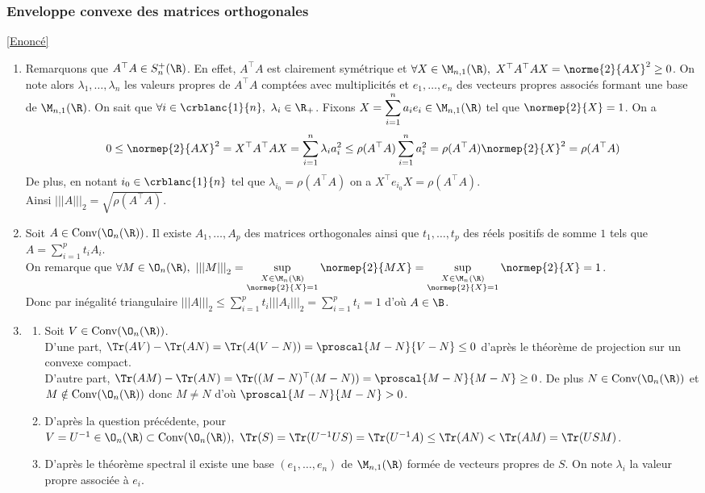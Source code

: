 \documentclass[8pt]{book}
\begin{document}
	\subsubsection{Enveloppe convexe des matrices orthogonales}
	\label{Enveloppe convexe des matrices orthogonalesd corrigé}
	\textcolor{blue}{\hyperref[Enveloppe convexe des matrices orthogonales]{[Enoncé]}}\\
	\begin{enumerate}[leftmargin=*]
		\item Remarquons que $A^\top A\in S_n^+(\R)$. En effet, $A^\top A$ est clairement symétrique et $\forall X\in \M_{n,1}(\R),\ X^\top A^\top AX=\norme{2}{AX}^2\geq 0$. On note alors $\lambda_1,\dots,\lambda_n$ les valeurs propres de $A^\top A$ comptées avec multiplicités et $e_1,\dots,e_n$ des vecteurs propres associés formant une base de $\M_{n,1}(\R)$. On sait que $\forall i\in \crblanc{1}{n},\ \lambda_i\in \R_+$. Fixons $X=\displaystyle\sum_{i=1}^na_ie_i\in \M_{n,1}(\R)$ tel que $\normep{2}{X}=1$. On a\\
		$$0\leq \normep{2}{AX}^2=X^\top A^\top AX=\sum_{i=1}^n\lambda_ia_i^2\leq \rho(A^\top A)\sum_{i=1}^na_i^2=\rho(A^\top A)\normep{2}{X}^2=\rho(A^\top A)$$
		De plus, en notant $i_0\in \crblanc{1}{n}$ tel que $\lambda_{i_0}=\rho(A^\top A)$ on a $X^\top e_{i_0}X=\rho(A^\top A)$.\\
		Ainsi ${|||A|||}_2=\sqrt{\rho(A^\top A)}$.
		\item Soit $A\in \text{Conv}(\O_n(\R))$. Il existe $A_1,\dots,A_p$ des matrices orthogonales ainsi que $t_1,\dots,t_p$ des réels positifs de somme $1$ tels que $A=\displaystyle\sum_{i=1}^pt_iA_i$.\\
		On remarque que $\forall M\in \O_n(\R),\ {|||M|||}_2=\sup\limits_{\substack{X\in \M_n(\R)\\\normep{2}{X}=1}}\normep{2}{MX}=\sup\limits_{\substack{X\in \M_n(\R)\\\normep{2}{X}=1}}\normep{2}{X}=1$.\\
		Donc par inégalité triangulaire ${|||A|||}_2\leq \displaystyle\sum_{i=1}^pt_i{|||A_i|||}_2=\sum_{i=1}^pt_i=1$ d'où $A\in \B$.
		\item \begin{enumerate}[label=\alph*.]
			\item Soit $V\in \text{Conv}(\O_n(\R))$.\\
			D'une part, $\Tr(AV)-\Tr(AN)=\Tr(A(V-N))=\proscal{M-N}{V-N}\leq 0$ d'après le théorème de projection sur un convexe compact.\\
			D'autre part, $\Tr(AM)-\Tr(AN)=\Tr((M-N)^\top(M-N))=\proscal{M-N}{M-N}\geq 0$. De plus $N\in \text{Conv}(\O_n(\R))$ et $M\notin \text{Conv}(\O_n(\R))$ donc $M\ne N$ d'où $\proscal{M-N}{M-N}>0$.
			\item D'après la question précédente, pour $V=U^{-1}\in \O_n(\R)\subset \text{Conv}(\O_n(\R)),\ \Tr(S)=\Tr(U^{-1}US)=\Tr(U^{-1}A)\leq \Tr(AN)<\Tr(AM)=\Tr(USM)$.
			\item D'après le théorème spectral il existe une base $(e_1,\dots,e_n)$ de $\M_{n,1}(\R)$ formée de vecteurs propres de $S$. On note $\lambda_i$ la valeur propre associée à $e_i$.\\
			

\end{enumerate}
\end{enumerate}
\end{document}
